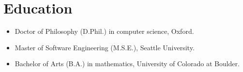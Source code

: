 \section*{Education}
\vspace{-2mm}

\begin{itemize}
    \item Doctor of Philosophy (D.Phil.) in computer science, Oxford.\vspace{-2mm}
	\item Master of Software Engineering (M.S.E.), Seattle University.\vspace{-2mm}
	\item Bachelor of Arts (B.A.) in mathematics, University of Colorado at Boulder.
\end{itemize}

